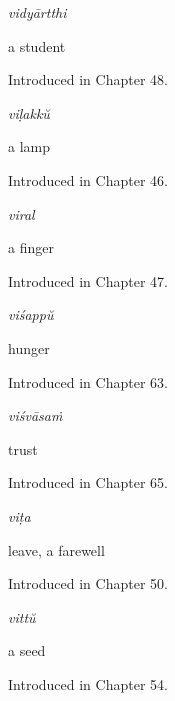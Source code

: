 \noindent\begin{minipage}[t]{\linewidth}
\raggedright
\textbf{}\enspace\emph{vidyārtthi}\par
\small a student\par
\footnotesize Introduced in Chapter 48.
\end{minipage}\par\medskip

\noindent\begin{minipage}[t]{\linewidth}
\raggedright
\textbf{}\enspace\emph{viḷakkŭ}\par
\small a lamp\par
\footnotesize Introduced in Chapter 46.
\end{minipage}\par\medskip

\noindent\begin{minipage}[t]{\linewidth}
\raggedright
\textbf{}\enspace\emph{viral}\par
\small a finger\par
\footnotesize Introduced in Chapter 47.
\end{minipage}\par\medskip

\noindent\begin{minipage}[t]{\linewidth}
\raggedright
\textbf{}\enspace\emph{viśappŭ}\par
\small hunger\par
\footnotesize Introduced in Chapter 63.
\end{minipage}\par\medskip

\noindent\begin{minipage}[t]{\linewidth}
\raggedright
\textbf{}\enspace\emph{viśvāsaṁ}\par
\small trust\par
\footnotesize Introduced in Chapter 65.
\end{minipage}\par\medskip

\noindent\begin{minipage}[t]{\linewidth}
\raggedright
\textbf{}\enspace\emph{viṭa}\par
\small leave, a farewell\par
\footnotesize Introduced in Chapter 50.
\end{minipage}\par\medskip

\noindent\begin{minipage}[t]{\linewidth}
\raggedright
\textbf{}\enspace\emph{vittŭ}\par
\small a seed\par
\footnotesize Introduced in Chapter 54.
\end{minipage}\par\medskip


